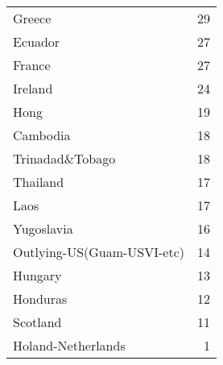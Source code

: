 \begin{table}
\begin{tabular}{lr}
 Greece                     &              29 \\
 Ecuador                    &              27 \\
 France                     &              27 \\
 Ireland                    &              24 \\
 Hong                       &              19 \\
 Cambodia                   &              18 \\
 Trinadad\&Tobago            &              18 \\
 Thailand                   &              17 \\
 Laos                       &              17 \\
 Yugoslavia                 &              16 \\
 Outlying-US(Guam-USVI-etc) &              14 \\
 Hungary                    &              13 \\
 Honduras                   &              12 \\
 Scotland                   &              11 \\
 Holand-Netherlands         &               1 \\
\bottomrule
\end{tabular}
\end{table}
